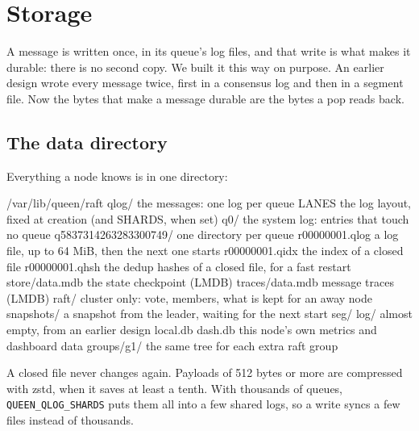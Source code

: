 
\section{Storage}

A message is written once, in its queue's log files, and that write is what makes it durable:
there is no second copy. We built it this way on purpose. An earlier design wrote every message
twice, first in a consensus log and then in a segment file. Now the bytes that make a message
durable are the bytes a pop reads back.

\subsection{The data directory}

Everything a node knows is in one directory:

\begin{shell}
/var/lib/queen/raft
  qlog/                    the messages: one log per queue
    LANES                  the log layout, fixed at creation (and SHARDS, when set)
    q0/                    the system log: entries that touch no queue
    q5837314263283300749/  one directory per queue
      r00000001.qlog       a log file, up to 64 MiB, then the next one starts
      r00000001.qidx       the index of a closed file
      r00000001.qhsh       the dedup hashes of a closed file, for a fast restart
  store/data.mdb           the state checkpoint (LMDB)
  traces/data.mdb          message traces (LMDB)
  raft/                    cluster only: vote, members, what is kept for an away node
  snapshots/               a snapshot from the leader, waiting for the next start
  seg/  log/               almost empty, from an earlier design
  local.db  dash.db        this node's own metrics and dashboard data
  groups/g1/               the same tree for each extra raft group
\end{shell}

A closed file never changes again. Payloads of 512 bytes or more are compressed with zstd, when it
saves at least a tenth. With thousands of queues, \texttt{QUEEN\_QLOG\_SHARDS} puts them all into a
few shared logs, so a write syncs a few files instead of thousands.

